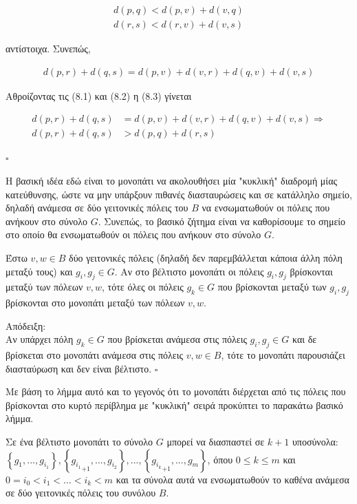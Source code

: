 \documentclass[oneside,12pt]{book}
\theoremstyle{definition}
\begin{document}
\begin{align}
	d(p,q) < d(p,v) + d(v,q) \\
	d(r,s) < d(r,v) + d(v,s)	
\end{align}

αντίστοιχα. Συνεπώς,

\begin{align}
	d(p,r) + d(q,s) = d(p,v) + d(v,r) + d(q,v) + d(v,s)
\end{align}

Αθροίζοντας τις (8.1) και (8.2) η (8.3) γίνεται

\begin{align*}
	d(p,r) + d(q,s) &= d(p,v) + d(v,r) + d(q,v) + d(v,s) \Rightarrow \\
	d(p,r) + d(q,s) &> d(p,q) + d(r,s)
\end{align*}

\(\square\)

Η βασική ιδέα εδώ είναι το μονοπάτι να ακολουθήσει μία "κυκλική" διαδρομή μίας κατεύθυνσης, ώστε να μην υπάρξουν πιθανές διασταυρώσεις και σε κατάλληλο σημείο, δηλαδή ανάμεσα σε δύο γειτονικές πόλεις του \(B\) να ενσωματωθούν οι πόλεις που ανήκουν στο σύνολο \(G\). Συνεπώς, το βασικό ζήτημα είναι να καθορίσουμε το σημείο στο οποίο θα ενσωματωθούν οι πόλεις που ανήκουν στο σύνολο \(G\). \\

\begin{mylemma}{}{}
	Έστω \(v,w \in B\) δύο γειτονικές πόλεις (δηλαδή δεν παρεμβάλλεται κάποια άλλη πόλη μεταξύ τους) και \(g_i, g_j \in G\). Αν στο βέλτιστο μονοπάτι οι πόλεις \(g_i, g_j\) βρίσκονται μεταξύ των πόλεων \(v,w\), τότε όλες οι πόλεις \(g_k \in G\) που βρίσκονται μεταξύ των \(g_i, g_j\) βρίσκονται στο μονοπάτι μεταξύ των πόλεων \(v,w\).
\end{mylemma} 

Απόδειξη: \\
Αν υπάρχει πόλη \(g_k \in G\) που βρίσκεται ανάμεσα στις πόλεις \(g_i, g_j \in G\) και δε βρίσκεται στο μονοπάτι ανάμεσα στις πόλεις \(v,w \in B\), τότε το μονοπάτι παρουσιάζει διασταύρωση και δεν είναι βέλτιστο. \(\square\)

Με βάση το λήμμα αυτό και το γεγονός ότι το μονοπάτι διέρχεται από τις πόλεις που βρίσκονται στο κυρτό περίβλημα με "κυκλική" σειρά προκύπτει το παρακάτω βασικό λήμμα. \\

\begin{mylemma}{}{}
	Σε ένα βέλτιστο μονοπάτι το σύνολο \(G\) μπορεί να διασπαστεί σε \(k+1\) υποσύνολα: \(\left\{g_1,...,g_{i_1}\right\}, \left\{{g_{i_1}}_{+1},...,g_{i_2}\right\},...,\left\{{g_{i_k}}_{+1},...,g_{m}\right\}\), όπου \(0 \leq k \leq m\) και \(0=i_0 < i_1 < ... < i_k < m\) και τα σύνολα αυτά να ενσωματωθούν το καθένα ανάμεσα σε δύο γειτονικές πόλεις του συνόλου \(B\).
\end{mylemma}
\end{document}
